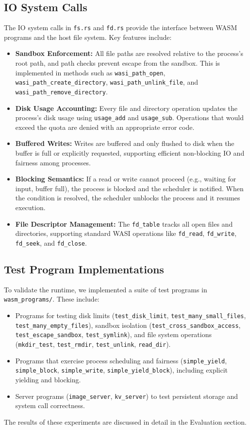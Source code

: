 \documentclass[10pt,a4paper,twocolumn]{IEEEtran}
\begin{document}
\subsection*{IO System Calls}
The IO system calls in \texttt{fs.rs} and \texttt{fd.rs} provide the interface between WASM programs and the host file system. Key features include:
\begin{itemize}
    \item \textbf{Sandbox Enforcement:} All file paths are resolved relative to the process's root path, and path checks prevent escape from the sandbox. This is implemented in methods such as \texttt{wasi\_path\_open}, \texttt{wasi\_path\_create\_directory}, \texttt{wasi\_path\_unlink\_file}, and \texttt{wasi\_path\_remove\_directory}.
    \item \textbf{Disk Usage Accounting:} Every file and directory operation updates the process's disk usage using \texttt{usage\_add} and \texttt{usage\_sub}. Operations that would exceed the quota are denied with an appropriate error code.
    \item \textbf{Buffered Writes:} Writes are buffered and only flushed to disk when the buffer is full or explicitly requested, supporting efficient non-blocking IO and fairness among processes.
    \item \textbf{Blocking Semantics:} If a read or write cannot proceed (e.g., waiting for input, buffer full), the process is blocked and the scheduler is notified. When the condition is resolved, the scheduler unblocks the process and it resumes execution.
    \item \textbf{File Descriptor Management:} The \texttt{fd\_table} tracks all open files and directories, supporting standard WASI operations like \texttt{fd\_read}, \texttt{fd\_write}, \texttt{fd\_seek}, and \texttt{fd\_close}.
\end{itemize}

\subsection*{Test Program Implementations}
To validate the runtime, we implemented a suite of test programs in \texttt{wasm\_programs/}. These include:
\begin{itemize}
    \item Programs for testing disk limits (\texttt{test\_disk\_limit}, \texttt{test\_many\_small\_files}, \texttt{test\_many\_empty\_files}), sandbox isolation (\texttt{test\_cross\_sandbox\_access}, \texttt{test\_escape\_sandbox}, \texttt{test\_symlink}), and file system operations (\texttt{mkdir\_test}, \texttt{test\_rmdir}, \texttt{test\_unlink}, \texttt{read\_dir}).
    \item Programs that exercise process scheduling and fairness (\texttt{simple\_yield}, \texttt{simple\_block}, \texttt{simple\_write}, \texttt{simple\_yield\_block}), including explicit yielding and blocking.
    \item Server programs (\texttt{image\_server}, \texttt{kv\_server}) to test persistent storage and system call correctness.
\end{itemize}
The results of these experiments are discussed in detail in the Evaluation section.
\end{document}
